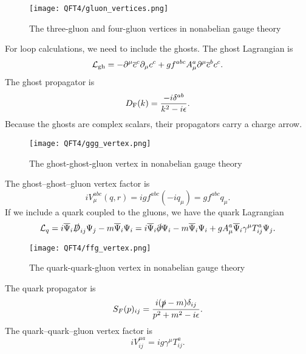 \begin{figure}[!h]
	\centering
	\texttt{[image: QFT4/gluon\_vertices.png]}
	\caption{The three-gluon and four-gluon vertices in nonabelian gauge theory}
\end{figure}

\noindent
For loop calculations, we need to include the ghosts. The ghost Lagrangian is
\[\mathcal{L}_{\rm gh} = -\partial^{\mu}\overline{c}^c \partial_{\mu}c^c + gf^{abc}A^a_{\mu}\partial^{\mu}\overline{c}^b c^c.\]
The ghost propagator is
\[D_{\rm F}(k) = \frac{-i\delta^{ab}}{k^2-i\epsilon}.\]
Because the ghosts are complex scalars, their propagators carry a charge arrow. 

\begin{figure}[!h]
	\centering
	\texttt{[image: QFT4/ggg\_vertex.png]}
	\caption{The ghost-ghost-gluon vertex in nonabelian gauge theory}
\end{figure}

\noindent
The ghost–ghost–gluon vertex factor is
\[iV^{abc}_{\mu}(q,r) = igf^{abc}(-iq_{\mu}) = gf^{abc}q_{\mu}.\]
If we include a quark coupled to the gluons, we have the quark Lagrangian
\[\mathcal{L}_{q} = i\overline{\Psi}_{i}\slashed{D}_{ij}\Psi_{j} - m\overline{\Psi}_{i}\Psi_{i} = i\overline{\Psi}_{i}\slashed{\partial}\Psi_{i} - m\overline{\Psi}_{i}\Psi_{i} + gA^a_{\mu}\overline{\Psi}_{i} \gamma^{\mu} T^a_{ij} \Psi_j .\]

\begin{figure}[!h]
	\centering
	\texttt{[image: QFT4/ffg\_vertex.png]}
	\caption{The quark-quark-gluon vertex in nonabelian gauge theory}
\end{figure}

\noindent
The quark propagator is
\[S_F(p)_{ij} = \frac{i(\slashed{p}-m)\delta_{ij}}{p^2+m^2 - i\epsilon}.\]
The quark–quark–gluon vertex factor is
\[iV^{\mu a}_{ij} =  ig\gamma^{\mu}T^a_{ij}.\]

